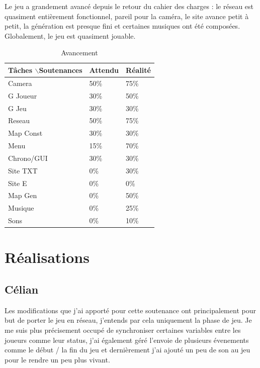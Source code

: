 \documentclass{article}
\begin{document}
Le jeu a grandement avancé depuis le retour du cahier des charges : le réseau est quasiment entièrement fonctionnel, pareil pour la caméra, le site avance petit à petit, la génération est presque fini et certaines musiques ont été composées. Globalement, le jeu est quasiment jouable.
\begin{table}[!h]
\centering
\caption{Avancement}
\begin{tabular}{|l|l|l|}

\hline
Tâches $\backslash$Soutenances & Attendu & Réalité \\ \hline
Camera & 50\% & 75\% \\ \hline
G Joueur & 30\% & 50\% \\ \hline
G Jeu & 30\% & 30\% \\ \hline
Reseau & 50\% & 75\% \\ \hline
Map Const & 30\% & 30\% \\ \hline
Menu & 15\% & 70\% \\ \hline
Chrono/GUI & 30\% & 30\% \\ \hline
Site TXT & 0\% & 30\% \\ \hline
Site E & 0\% & 0\% \\ \hline
Map Gen & 0\% & 50\% \\ \hline
Musique & 0\% & 25\% \\ \hline
Sons & 0\% & 10\% \\ \hline

\end{tabular}
\end{table}
 
\newpage
\section{Réalisations}



\newpage
\subsection{Célian}

Les modifications que j'ai apporté pour cette soutenance ont principalement pour but de porter le jeu en réseau, j'entends par cela uniquement la phase de jeu. Je me suis plus précisement occupé de synchroniser certaines variables entre les joueurs comme leur status, j'ai également géré l'envoie de plusieurs évenements comme le début / la fin du jeu et dernièrement j'ai ajouté un peu de son au jeu pour le rendre un peu plus vivant.
\end{document}
